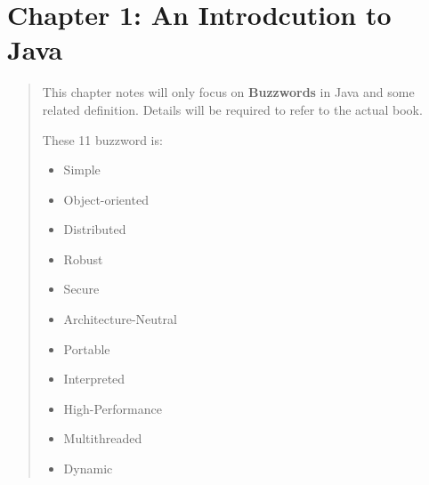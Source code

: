 \documentclass[12pt]{article}
\begin{document}
\section{Chapter 1: An Introdcution to Java}
\begin{abstract}
This chapter notes will only focus on \textbf{Buzzwords} in Java and some related definition.
Details will be required to refer to the actual book.

These 11 buzzword is: 
\begin{itemize}
    \item Simple
    \item Object-oriented
    \item Distributed
    \item Robust
    \item Secure
    \item Architecture-Neutral
    \item Portable
    \item Interpreted
    \item High-Performance
    \item Multithreaded
    \item Dynamic
\end{itemize}
\end{abstract}
\end{document}
